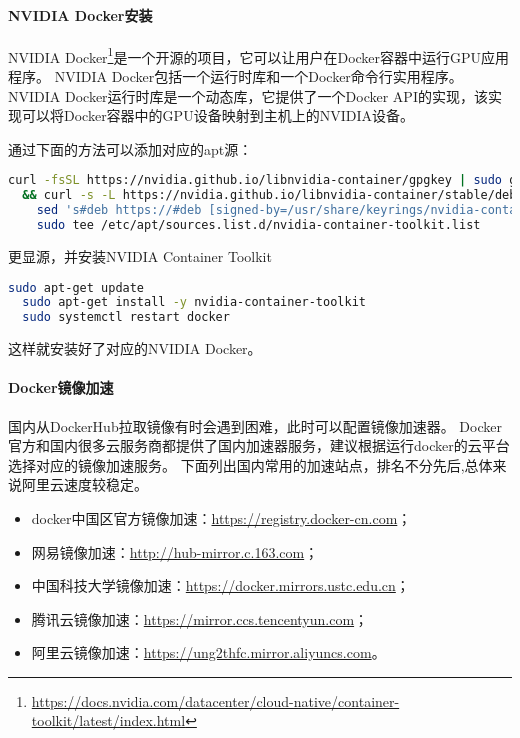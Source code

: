\documentclass[lang=cn,a4paper,newtx]{elegantpaper}
\begin{document}
\paragraph{NVIDIA Docker安装}
NVIDIA Docker\footnote{\url{https://docs.nvidia.com/datacenter/cloud-native/container-toolkit/latest/index.html}}是一个开源的项目，它可以让用户在Docker容器中运行GPU应用程序。
NVIDIA Docker包括一个运行时库和一个Docker命令行实用程序。
NVIDIA Docker运行时库是一个动态库，它提供了一个Docker API的实现，该实现可以将Docker容器中的GPU设备映射到主机上的NVIDIA设备。

通过下面的方法可以添加对应的apt源：
\begin{lstlisting}[language=bash]
  curl -fsSL https://nvidia.github.io/libnvidia-container/gpgkey | sudo gpg --dearmor -o /usr/share/keyrings/nvidia-container-toolkit-keyring.gpg \
  && curl -s -L https://nvidia.github.io/libnvidia-container/stable/deb/nvidia-container-toolkit.list | \
    sed 's#deb https://#deb [signed-by=/usr/share/keyrings/nvidia-container-toolkit-keyring.gpg] https://#g' | \
    sudo tee /etc/apt/sources.list.d/nvidia-container-toolkit.list
\end{lstlisting}

更显源，并安装NVIDIA Container Toolkit
\begin{lstlisting}[language=bash]
  sudo apt-get update
  sudo apt-get install -y nvidia-container-toolkit
  sudo systemctl restart docker
\end{lstlisting}

这样就安装好了对应的NVIDIA Docker。


\paragraph{Docker镜像加速}
国内从DockerHub拉取镜像有时会遇到困难，此时可以配置镜像加速器。
Docker官方和国内很多云服务商都提供了国内加速器服务，建议根据运行docker的云平台选择对应的镜像加速服务。
下面列出国内常用的加速站点，排名不分先后,总体来说阿里云速度较稳定。
\begin{itemize}
  \item docker中国区官方镜像加速：\url{https://registry.docker-cn.com}；
  \item 网易镜像加速：\url{http://hub-mirror.c.163.com}；
  \item 中国科技大学镜像加速：\url{https://docker.mirrors.ustc.edu.cn}；
  \item 腾讯云镜像加速：\url{https://mirror.ccs.tencentyun.com}；
  \item 阿里云镜像加速：\url{https://ung2thfc.mirror.aliyuncs.com}。
\end{itemize}
\end{document}
